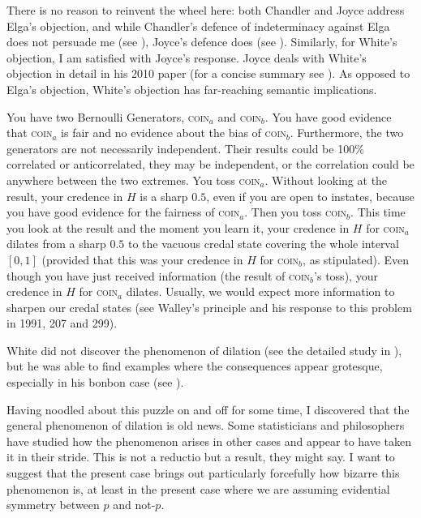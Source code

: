 \documentclass[11pt]{article}
\begin{document}
There is no reason to reinvent the wheel here: both Chandler and Joyce address Elga's objection, and while Chandler's defence of indeterminacy against Elga does not persuade me (see ), Joyce's defence does (see ). Similarly, for White's objection, I am satisfied with Joyce's response. Joyce deals with White's objection in detail in his 2010 paper (for a concise summary see ). As opposed to Elga's objection, White's objection has far-reaching semantic implications. 

You have two Bernoulli Generators, \textsc{coin}$_{a}$ and \textsc{coin}$_{b}$. You have good evidence that \textsc{coin}$_{a}$ is fair and no evidence about the bias of \textsc{coin}$_{b}$. Furthermore, the two generators are not necessarily independent. Their results could be 100\% correlated or anticorrelated, they may be independent, or the correlation could be anywhere between the two extremes. You toss \textsc{coin}$_{a}$. Without looking at the result, your credence in $H$ is a sharp $0.5$, even if you are open to instates, because you have good evidence for the fairness of \textsc{coin}$_{a}$. Then you toss \textsc{coin}$_{b}$. This time you look at the result and the moment you learn it, your credence in $H$ for \textsc{coin}$_{a}$ dilates from a sharp $0.5$ to the vacuous credal state covering the whole interval $[0,1]$ (provided that this was your credence in $H$ for \textsc{coin}$_{b}$, as stipulated). Even though you have just received information (the result of \textsc{coin}$_{b}$'s toss), your credence in $H$ for \textsc{coin}$_{a}$ dilates. Usually, we would expect more information to sharpen our credal states (see Walley's  principle and his response to this problem in 1991, 207 and 299).

White did not discover the phenomenon of dilation (see the detailed study in ), but he was able to find examples where the consequences appear grotesque, especially in his bonbon case (see ).

\begin{quotex}
  Having noodled about this puzzle on and off for some time, I discovered that the general phenomenon of dilation is old news. Some statisticians and philosophers have studied how the phenomenon arises in other cases and appear to have taken it in their stride. This is not a reductio but a result, they might say. I want to suggest that the present case brings out particularly forcefully how bizarre this phenomenon is, at least in the present case where we are assuming evidential symmetry between $p$ and not-$p$. 
\end{quotex}
\end{document}
